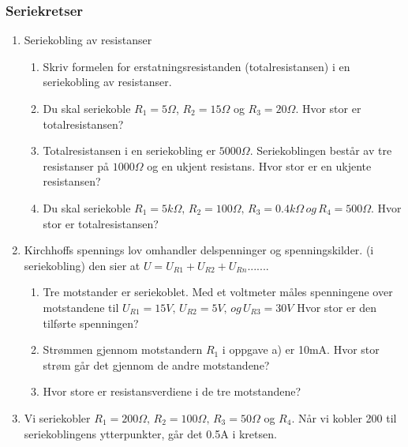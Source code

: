 \documentclass[12pt,a4paper]{article}
\begin{document}
\subsubsection{Seriekretser}
\begin{enumerate}
\item Seriekobling av resistanser

\begin{enumerate}
\item Skriv formelen for erstatningsresistanden (totalresistansen) i en
seriekobling av resistanser.
\item Du skal seriekoble $R_{1}=5\Omega$, $R_{2}=15\Omega$ og $R_{3}=20\Omega$.
Hvor stor er totalresistansen?
\item Totalresistansen i en seriekobling er $5000\Omega$. Seriekoblingen
består av tre resistanser på $1000\Omega$ og en ukjent resistans.
Hvor stor er en ukjente resistansen?
\item Du skal seriekoble $R_{1}=5k\Omega,\,R_{2}=100\Omega,\,R_{3}=0.4k\Omega\,og\,R_{4}=500\Omega$.
Hvor stor er totalresistansen?
\end{enumerate}
\item Kirchhoffs spennings lov omhandler delspenninger og spenningskilder.
(i seriekobling) den sier at $U=U_{R1}+U_{R2}+U_{Rn}$....... 

\begin{enumerate}
\item Tre motstander er seriekoblet. Med et voltmeter måles spenningene
over motstandene til $U_{R1}=15V,\,U_{R2}=5V,\,og\,U_{R3}=30V$ Hvor
stor er den tilførte spenningen?
\item Strømmen gjennom motstandern $R_{1}$ i oppgave a) er 10mA. Hvor stor
strøm går det gjennom de andre motstandene?
\item Hvor store er resistansverdiene i de tre motstandene?
\end{enumerate}
\item Vi seriekobler $R_{1}=200\Omega,\,R_{2}=100\Omega,\,R_{3}=50\Omega$
og $R_{4}$. Når vi kobler 200 til seriekoblingens ytterpunkter, går
det 0.5A i kretsen. 


\end{enumerate}
\end{document}
